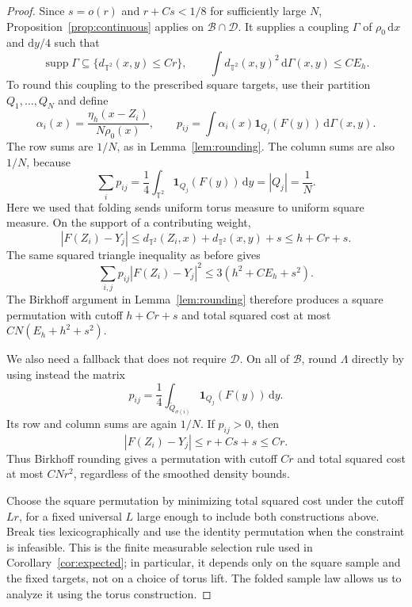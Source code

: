 \documentclass[11pt]{article}
\newcommand{\T}{\mathbb T^2}
\newcommand{\supp}{\operatorname{supp}}
\theoremstyle{remark}
\numberwithin{equation}{section}
\begin{document}
\begin{proof}
Since \(s=o(r)\) and \(r+Cs<1/8\) for sufficiently large \(N\),
Proposition~\ref{prop:continuous} applies on
\(\mathcal B\cap\mathcal D\). It supplies a coupling \(\Gamma\)
of \(\rho_0\,\mathrm dx\) and \(\mathrm dy/4\) such that
\[
 \supp\Gamma\subseteq\{d_{\T}(x,y)\le Cr\},
 \qquad
 \int d_{\T}(x,y)^2\,\mathrm d\Gamma(x,y)\le CE_h.
\]
To round this coupling to the prescribed square targets, use their
partition \(Q_1,\ldots,Q_N\) and define
\[
 \alpha_i(x)=\frac{\eta_h(x-Z_i)}{N\rho_0(x)},
 \qquad
 p_{ij}=\int\alpha_i(x)\mathbf1_{Q_j}(F(y))
              \,\mathrm d\Gamma(x,y).
\]
The row sums are \(1/N\), as in Lemma~\ref{lem:rounding}. The
column sums are also \(1/N\), because
\[
 \sum_i p_{ij}
 =\frac14\int_{\T}\mathbf1_{Q_j}(F(y))\,\mathrm dy
 =|Q_j|=\frac1N.
\]
Here we used that folding sends uniform torus measure to uniform
square measure. On the support of a contributing weight,
\[
 |F(Z_i)-Y_j|
 \le d_{\T}(Z_i,x)+d_{\T}(x,y)+s
 \le h+Cr+s.
\]
The same squared triangle inequality as before gives
\[
 \sum_{i,j}p_{ij}|F(Z_i)-Y_j|^2
 \le3(h^2+CE_h+s^2).
\]
The Birkhoff argument in Lemma~\ref{lem:rounding} therefore produces
a square permutation with cutoff \(h+Cr+s\) and total squared
cost at most \(CN(E_h+h^2+s^2)\).

We also need a fallback that does not require \(\mathcal D\).
On all of \(\mathcal B\), round \(\Lambda\) directly by using
instead the matrix
\[
 p_{ij}=\frac14\int_{\widetilde Q_{\sigma(i)}}
                   \mathbf1_{Q_j}(F(y))\,\mathrm dy.
\]
Its row and column sums are again \(1/N\). If \(p_{ij}>0\), then
\[
 |F(Z_i)-Y_j|\le r+Cs+s\le Cr.
\]
Thus Birkhoff rounding gives a permutation with cutoff \(Cr\) and
total squared cost at most \(CNr^2\), regardless of the smoothed
density bounds.

Choose the square permutation by minimizing total squared cost under
the cutoff \(Lr\), for a fixed universal \(L\) large enough to
include both constructions above. Break ties lexicographically and
use the identity permutation when the constraint is infeasible. This
is the finite measurable selection rule used in
Corollary~\ref{cor:expected}; in particular, it depends only on
the square sample and the fixed targets, not on a choice of torus
lift. The folded sample law allows us to analyze it using the torus
construction.


\end{proof}
\end{document}
